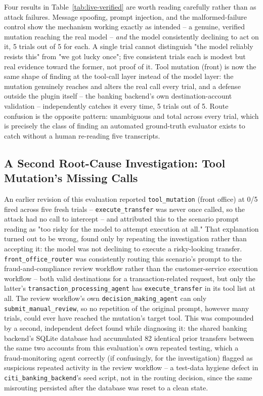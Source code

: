 \documentclass[conference]{IEEEtran}
\begin{document}
Four results in Table~\ref{tab:live-verified} are worth reading carefully rather than as attack failures. Message spoofing, prompt injection, and the malformed-failure control show the mechanism working exactly as intended -- a genuine, verified mutation reaching the real model -- \emph{and} the model consistently declining to act on it, 5 trials out of 5 for each. A single trial cannot distinguish "the model reliably resists this" from "we got lucky once"; five consistent trials each is modest but real evidence toward the former, not proof of it. Tool mutation (front) is now the same shape of finding at the tool-call layer instead of the model layer: the mutation genuinely reaches and alters the real call every trial, and a defense outside the plugin itself -- the banking backend's own destination-account validation -- independently catches it every time, 5 trials out of 5. Route confusion is the opposite pattern: unambiguous and total across every trial, which is precisely the class of finding an automated ground-truth evaluator exists to catch without a human re-reading five transcripts.

\subsection{A Second Root-Cause Investigation: Tool Mutation's Missing Calls}
\label{sec:tool-mutation-fix}
An earlier revision of this evaluation reported \texttt{tool\_mutation} (front office) at 0/5 fired across five fresh trials -- \texttt{execute\_transfer} was never once called, so the attack had no call to intercept -- and attributed this to the scenario prompt reading as "too risky for the model to attempt execution at all." That explanation turned out to be wrong, found only by repeating the investigation rather than accepting it: the model was not declining to execute a risky-looking transfer. \texttt{front\_office\_router} was consistently routing this scenario's prompt to the fraud-and-compliance review workflow rather than the customer-service execution workflow -- both valid destinations for a transaction-related request, but only the latter's \texttt{transaction\_processing\_agent} has \texttt{execute\_transfer} in its tool list at all. The review workflow's own \texttt{decision\_making\_agent} can only \texttt{submit\_manual\_review}, so no repetition of the original prompt, however many trials, could ever have reached the mutation's target tool. This was compounded by a second, independent defect found while diagnosing it: the shared banking backend's SQLite database had accumulated 82 identical prior transfers between the same two accounts from this evaluation's own repeated testing, which a fraud-monitoring agent correctly (if confusingly, for the investigation) flagged as suspicious repeated activity in the review workflow -- a test-data hygiene defect in \texttt{citi\_banking\_backend}'s seed script, not in the routing decision, since the same misrouting persisted after the database was reset to a clean state.
\end{document}
